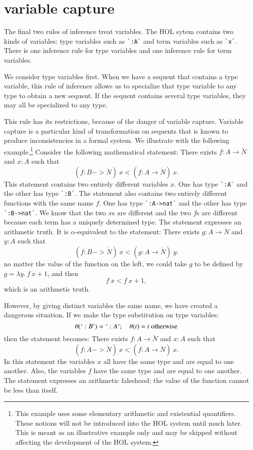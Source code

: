 \section{variable capture}

The final two rules of inference treat variables.  The HOL sytem contains two kinds of variables: type variables such as \verb!`:A`! and term variables such as \verb!`x`!.  There is one inference rule for type variables and one inference rule for term variables.  


We consider type variables first.
When we have a sequent that contains a type variable, this rule of inference allows us to specialize that type variable to any type to obtain a new sequent.  If the sequent contains several type variables, they may all be specialized to any type.

This rule has its restrictions, because of the danger of variable capture.  Variable capture is a particular kind of transformation on sequents that is known to produce inconsistencies in a formal system.  We illustrate with the following example.\footnote{This example uses some elementary arithmetic and existential quantifiers.  These notions will not be introduced into the HOL system until much later.  This is meant as an illustrative example only and may be skipped without affecting the development of the HOL system.}  Consider the following mathematical statement: There exists $f:A\to\ring{N}$ and $x:A$ such that
$$
(f:B->\ring{N})~x < (f:A\to\ring{N})~x.
$$
This statement contains two entirely different variables $x$.  One has type \verb!`:A`! and the other has type \verb!`:B`!.  The statement also contains two entirely different functions with the same name $f$.  One has type \verb!`:A->nat`! and the other has type \verb!`:B->nat`!.  We know that the two $x$s are different and the two $f$s are different because each term has a uniquely determined type.  The statement expresses an arithmetic truth.  It is $\alpha$-equivalent to the statement: 
There exists $g:A\to\ring{N}$ and $y:A$ such that
$$
(f:B->\ring{N})~x < (g:A\to\ring{N})~y.
$$
no matter the value of the function on the left, we could take $g$ to be defined by $g = \lambda y.~f~x + 1$, and then
$$
f~x < f~x + 1,
$$
which is an arithmetic truth.

However, by giving distinct variables the same name, we have created a dangerous situation.  If we make the type substitution on type variables:
$$
\theta(`:B`) = `:A`;\quad \theta(t)=t\hbox{ otherwise}
$$
then the statement becomes:
There exists $f:A\to\ring{N}$ and $x:A$ such that
$$
(f:A->\ring{N})~x < (f:A\to\ring{N})~x.
$$
In this statement the variables $x$ all have the same type and are equal to one another.  Also, the variables $f$ have the same type and are equal to one another.  The statement expresses an arithmetic falsehood; the value of the function cannot be less than itself.

